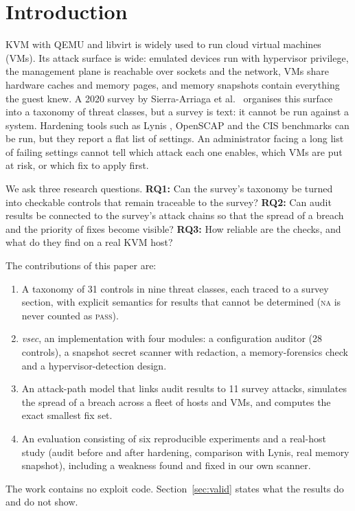 \documentclass[conference]{IEEEtran}
\newcommand{\pass}{\textsc{pass}}
\newcommand{\na}{\textsc{na}}
\begin{document}
\section{Introduction}
KVM with QEMU and libvirt is widely used to run cloud virtual machines (VMs). Its attack surface is wide: emulated devices run with hypervisor privilege, the management plane is reachable over sockets and the network, VMs share hardware caches and memory pages, and memory snapshots contain everything the guest knew. A 2020 survey by Sierra-Arriaga et al.\ \cite{survey} organises this surface into a taxonomy of threat classes, but a survey is text: it cannot be run against a system. Hardening tools such as Lynis \cite{lynis}, OpenSCAP \cite{openscap} and the CIS benchmarks \cite{cis} can be run, but they report a flat list of settings. An administrator facing a long list of failing settings cannot tell which attack each one enables, which VMs are put at risk, or which fix to apply first.

We ask three research questions.
\textbf{RQ1:} Can the survey's taxonomy be turned into checkable controls that remain traceable to the survey?
\textbf{RQ2:} Can audit results be connected to the survey's attack chains so that the spread of a breach and the priority of fixes become visible?
\textbf{RQ3:} How reliable are the checks, and what do they find on a real KVM host?

\noindent The contributions of this paper are:
\begin{enumerate}
\item A taxonomy of 31 controls in nine threat classes, each traced to a survey section, with explicit semantics for results that cannot be determined (\na{} is never counted as \pass).
\item \emph{vsec}, an implementation with four modules: a configuration auditor (28 controls), a snapshot secret scanner with redaction, a memory-forensics check and a hypervisor-detection design.
\item An attack-path model that links audit results to 11 survey attacks, simulates the spread of a breach across a fleet of hosts and VMs, and computes the exact smallest fix set.
\item An evaluation consisting of six reproducible experiments and a real-host study (audit before and after hardening, comparison with Lynis, real memory snapshot), including a weakness found and fixed in our own scanner.
\end{enumerate}
The work contains no exploit code. Section~\ref{sec:valid} states what the results do and do not show.
\end{document}
